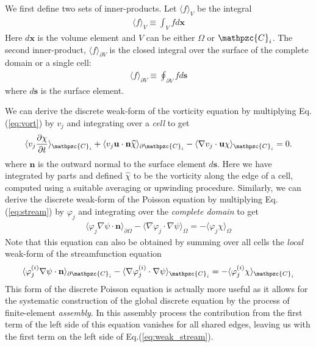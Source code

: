 \documentclass[11pt, reqno]{amsart}
\newcommand{\eqr}[1]{Eq.\thinspace(#1)}
\newcommand{\pfrac}[2]{\frac{\partial #1}{\partial #2}}
\newcommand{\mvec}[1]{\mathbf{#1}}
\newcommand{\script}[1]{\mathpzc{#1}}
\newcommand{\iprod}[2]{\langle{#1}\rangle_{#2}}
\theoremstyle{definition}
\begin{document}
We first define two sets of inner-products. Let $\langle f\rangle
_V$ be the integral
\begin{align}
  \langle f\rangle_V \equiv \int_V f d\mvec{x}
\end{align}
Here $d\mvec{x}$ is the volume element and $V$ can be either $\Omega$
or $\script{C}_i$. The second inner-product, $\langle
f\rangle_{\partial V}$ is the closed integral over the surface of the
complete domain or a single cell:
\begin{align}
  \langle f\rangle_{\partial V} \equiv \oint_{\partial V} f
  d\mvec{s}
\end{align}
where $d\mvec{s}$ is the surface element. 

We can derive the discrete weak-form of the vorticity equation by
multiplying \eqr{\ref{eq:vort}} by $v_j$ and integrating over a
\emph{cell} to get
\begin{align}
  \iprod{v_j\pfrac{\chi}{t}}{\script{C}_i} 
  +
  \iprod{v_j\mvec{u}\cdot\mvec{n} \widehat{\chi}}{\partial \script{C}_i}
  -
  \iprod{\nabla v_j\cdot \mvec{u}\chi}{\script{C}_i}
  = 0. \label{eq:weak_vort}
\end{align}
where $\mvec{n}$ is the outward normal to the surface element
$d\mvec{s}$. Here we have integrated by parts and defined
$\widehat{\chi}$ to be the vorticity along the edge of a cell,
computed using a suitable averaging or upwinding procedure. Similarly,
we can derive the discrete weak-form of the Poisson equation by
multiplying \eqr{\ref{eq:stream}} by $\varphi_j$ and integrating over
the \emph{complete domain} to get
\begin{align}
  \iprod{\varphi_j \nabla\psi \cdot \mvec{n}}{\partial \Omega}
  -
  \iprod{\nabla \varphi_j\cdot \nabla\psi}{\Omega}
  =
  -
  \iprod{\varphi_j\chi}{\Omega} \label{eq:weak_stream}
\end{align}
Note that this equation can also be obtained by summing over all cells
the \emph{local} weak-form of the streamfunction equation
\begin{align}
  \iprod{\varphi_j^{(i)} \nabla\psi \cdot \mvec{n}}{\partial \script{C}_i}
  -
  \iprod{\nabla \varphi_j^{(i)}\cdot \nabla\psi}{\script{C}_i}
  =
  -
  \iprod{\varphi_j^{(i)}\chi}{\script{C}_i} \label{eq:local_weak_stream}
\end{align}
This form of the discrete Poisson equation is actually more useful as
it allows for the systematic construction of the global discrete
equation by the process of finite-element \emph{assembly}. In this
assembly process the contribution from the first term of the left side
of this equation vanishes for all shared edges, leaving us with the
first term on the left side of \eqr{\ref{eq:weak_stream}}.
\end{document}
